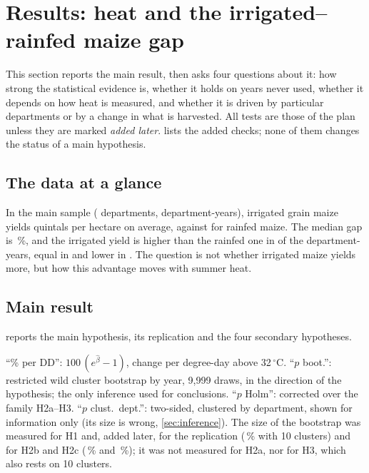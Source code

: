 \section{Results: heat and the irrigated--rainfed maize gap}
\label{sec:maize}

This section reports the main result, then asks four questions about it: how strong the statistical evidence is, whether it holds on years never used, whether it depends on how heat is measured, and whether it is driven by particular departments or by a change in what is harvested. All tests are those of the plan unless they are marked \emph{added later}.  lists the added checks; none of them changes the status of a main hypothesis.

\subsection{The data at a glance}

In the main sample (\MaizeMainDeps{} departments, \MaizeMainPairs{} department-years), irrigated grain maize yields \YieldIrr{} quintals per hectare on average, against \YieldRain{} for rainfed maize. The median gap is \GapMedianPct\,\%, and the irrigated yield is higher than the rainfed one in \GapAboveCount{} of the \MaizeMainPairs{} department-years, equal in \GapEqualCount{} and lower in \GapBelowCount. The question is not whether irrigated maize yields more, but how this advantage moves with summer heat.

\subsection{Main result}
\label{subsec:maize-main}

 reports the main hypothesis, its replication and the four secondary hypotheses.

\begin{table}[H]
\centering
\small
\caption{Maize: main and secondary hypotheses (July--August, maize mask)}
\label{tab:maize-hyp}
\begin{threeparttable}
{\setlength{\tabcolsep}{3.5pt}}
\begin{tablenotes}\footnotesize
\item ``\% per DD'': $100\,(e^{\hat\beta}-1)$, change per degree-day above 32\,$^{\circ}$C. ``$p$ boot.'': restricted wild cluster bootstrap by year, 9,999 draws, in the direction of the hypothesis; the only inference used for conclusions. ``$p$ Holm'': corrected over the family H2a--H3. ``$p$ clust.\ dept.'': two-sided, clustered by department, shown for information only (its size is wrong, \cref{sec:inference}). The size of the bootstrap was measured for H1 and, added later, for the replication (\ReplSize\,\% with 10 clusters) and for H2b and H2c (\HtwobSize\,\% and \HtwocSize\,\%); it was not measured for H2a, nor for H3, which also rests on 10 clusters.
\end{tablenotes}
\end{threeparttable}
\end{table}

